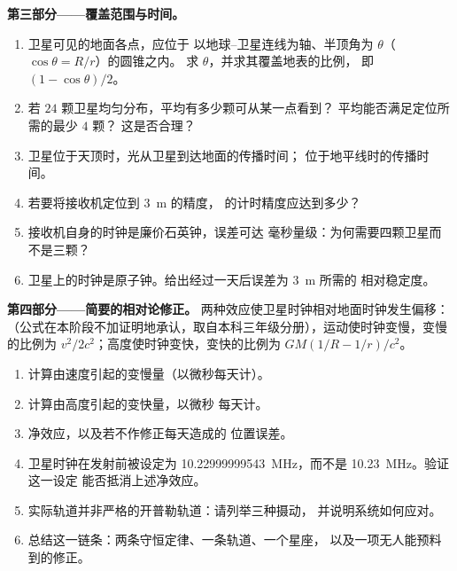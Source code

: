 \begin{problem}
\medskip
\noindent\textbf{第三部分——覆盖范围与时间。}
\begin{enumerate}[resume]
  \item 卫星可见的地面各点，应位于
        以地球–卫星连线为轴、半顶角为 $\theta$（$\cos\theta = R/r$）的圆锥之内。
        求 $\theta$，并求其覆盖地表的比例，
        即 $(1 - \cos\theta)/2$。
  \item 若 $24$ 颗卫星均匀分布，平均有多少颗可从某一点看到？
        平均能否满足定位所需的最少 $4$ 颗？
        这是否合理？
  \item 卫星位于天顶时，光从卫星到达地面的传播时间；
        位于地平线时的传播时间。
  \item 若要将接收机定位到 \qty{3}{m} 的精度，
        的计时精度应达到多少？
  \item 接收机自身的时钟是廉价石英钟，误差可达
        毫秒量级：为何需要四颗卫星而不是三颗？
  \item 卫星上的时钟是原子钟。给出经过一天后误差为 \qty{3}{m} 所需的
        相对稳定度。
\end{enumerate}

\medskip
\noindent\textbf{第四部分——简要的相对论修正。}
两种效应使卫星时钟相对地面时钟发生偏移：
（公式在本阶段不加证明地承认，取自本科三年级分册），运动使时钟变慢，变慢的比例为
$v^2/2c^2$；高度使时钟变快，变快的比例为 $GM(1/R - 1/r)/c^2$。
\begin{enumerate}[resume]
  \item 计算由速度引起的变慢量（以微秒每天计）。
  \item 计算由高度引起的变快量，以微秒
        每天计。
  \item 净效应，以及若不作修正每天造成的
        位置误差。
  \item 卫星时钟在发射前被设定为
        \qty{10.22999999543}{MHz}，而不是 \qty{10.23}{MHz}。验证这一设定
        能否抵消上述净效应。
  \item 实际轨道并非严格的开普勒轨道：请列举三种摄动，
        并说明系统如何应对。
  \item 总结这一链条：两条守恒定律、一条轨道、一个星座，
        以及一项无人能预料到的修正。
\end{enumerate}
\end{problem}
